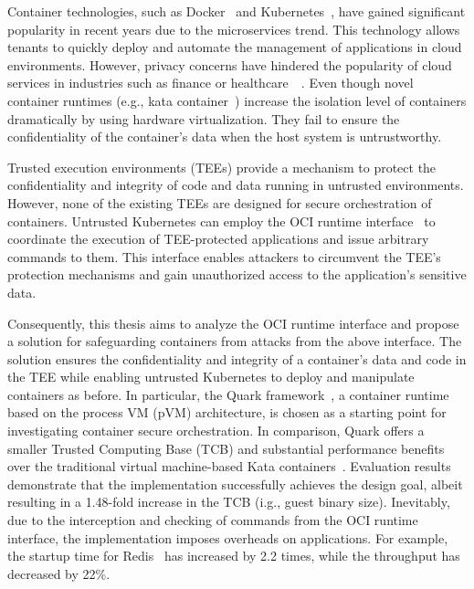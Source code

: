 




Container technologies, such as Docker~\cite*{lambacher} and Kubernetes~\cite*{k8s}, have gained significant popularity in recent years due to the microservices trend. This technology allows tenants to quickly deploy and automate the management of applications in cloud environments. However, privacy concerns 
have hindered the popularity of cloud services in industries such as finance or healthcare~\cite*{data_privacy}~\cite*{eu_data_Privacy}. Even though novel container runtimes (e.g., kata container~\cite*{Kata-Containers}) increase the isolation level of containers dramatically by using hardware virtualization. 
They fail to ensure the confidentiality of the container's data when the host system is untrustworthy.

Trusted execution environments (\acrshort{TEE}s) provide a mechanism to protect the confidentiality and integrity of code and data running in untrusted environments. However, none of the existing TEEs are designed for secure orchestration of containers. Untrusted Kubernetes\cite*{k8s} can 
employ the OCI runtime interface~\cite*{oci-runtime-spec} to coordinate the execution of TEE-protected applications and issue arbitrary commands to them. This interface enables attackers to circumvent the TEE's protection mechanisms and gain unauthorized access to 
the application's sensitive data.

Consequently, this thesis aims to analyze the OCI runtime interface and propose a solution for safeguarding containers from attacks from the above interface. The solution ensures the confidentiality and integrity of a container's data and code in the TEE while 
enabling untrusted Kubernetes\cite*{k8s} to deploy and manipulate containers as before. In particular, the Quark framework~\cite*{quark}, a container runtime based on the process VM (\acrshort{pVM}) architecture, is chosen as a starting point for investigating container secure orchestration. 
In comparison, Quark offers a smaller Trusted Computing Base (\acrshort{TCB}) and substantial performance benefits over the traditional virtual machine-based Kata containers~\cite*{quark_performance_report}. Evaluation results demonstrate that the implementation successfully achieves the design goal, albeit 
resulting in a 1.48-fold increase in the \acrshort{TCB} (i.g., guest binary size). Inevitably, due to the interception and checking of commands from the OCI runtime interface, the implementation imposes overheads on applications.  For example, the startup time for Redis~\cite*{redis} has 
increased by 2.2 times, while the throughput has decreased by 22\%.


